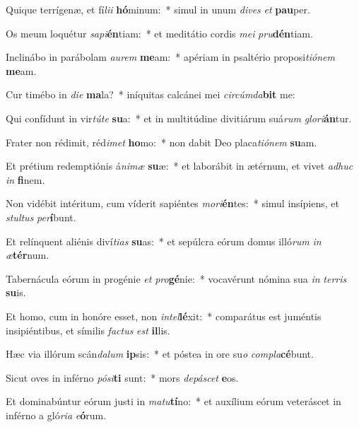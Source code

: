 \item Quique terrígenæ, et fí\textit{li}\textit{i} \textbf{hó}minum:~* simul in unum \textit{di}\textit{ves} \textit{et} \textbf{pau}per.
\item Os meum loquétur \textit{sa}\textit{pi}\textbf{én}tiam:~* et meditátio cordis \textit{me}\textit{i} \textit{pru}\textbf{dén}tiam.
\item Inclinábo in parábolam \textit{au}\textit{rem} \textbf{me}am:~* apériam in psaltério proposi\textit{ti}\textit{ó}\textit{nem} \textbf{me}am.
\item Cur timébo in \textit{di}\textit{e} \textbf{ma}la?~* iníquitas calcánei mei \textit{cir}\textit{cúm}\textit{da}\textbf{bit} me:
\item Qui confídunt in vir\textit{tú}\textit{te} \textbf{su}a:~* et in multitúdine divitiárum suá\textit{rum} \textit{glo}\textit{ri}\textbf{án}tur.
\item Frater non rédimit, réd\textit{i}\textit{met} \textbf{ho}mo:~* non dabit Deo placa\textit{ti}\textit{ó}\textit{nem} \textbf{su}am.
\item Et prétium redemptiónis á\textit{ni}\textit{mæ} \textbf{su}æ:~* et laborábit in ætérnum, et vivet \textit{ad}\textit{huc} \textit{in} \textbf{fi}nem.
\item Non vidébit intéritum, cum víderit sapiéntes \textit{mo}\textit{ri}\textbf{én}tes:~* simul insípiens, et \textit{stul}\textit{tus} \textit{per}\textbf{í}bunt.
\item Et relínquent aliénis diví\textit{ti}\textit{as} \textbf{su}as:~* et sepúlcra eórum domus illó\textit{rum} \textit{in} \textit{æ}\textbf{tér}num.
\item Tabernácula eórum in progénie \textit{et} \textit{pro}\textbf{gé}nie:~* vocavérunt nómina sua \textit{in} \textit{ter}\textit{ris} \textbf{su}is.
\item Et homo, cum in honóre esset, non \textit{in}\textit{tel}\textbf{lé}xit:~* comparátus est juméntis insipiéntibus, et símilis \textit{fac}\textit{tus} \textit{est} \textbf{il}lis.
\item Hæc via illórum scán\textit{da}\textit{lum} \textbf{ip}sis:~* et póstea in ore su\textit{o} \textit{com}\textit{pla}\textbf{cé}bunt.
\item Sicut oves in inférno \textit{pó}\textit{si}\textbf{ti} sunt:~* mors \textit{de}\textit{pá}\textit{scet} \textbf{e}os.
\item Et dominabúntur eórum justi in \textit{ma}\textit{tu}\textbf{tí}no:~* et auxílium eórum veteráscet in inférno a gló\textit{ri}\textit{a} \textit{e}\textbf{ó}rum.
